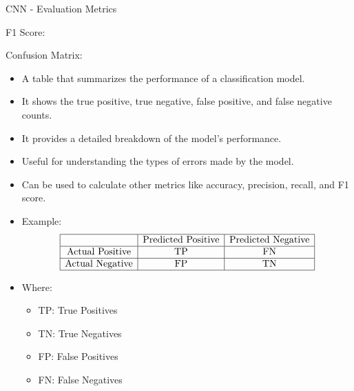 \begin{frame}{CNN - Evaluation Metrics}
\begin{block}{F1 Score:}
\begin{itemize}
    \end{itemize}
\end{block}
\framebreak
\begin{block}{Confusion Matrix:}
    \begin{itemize}
        \item A table that summarizes the performance of a classification model.
        \item It shows the true positive, true negative, false positive, and false negative counts.
        \item It provides a detailed breakdown of the model's performance.
        \item Useful for understanding the types of errors made by the model.
        \item Can be used to calculate other metrics like accuracy, precision, recall, and F1 score.
        \item Example:
            \[
            \begin{array}{|c|c|c|}
            \hline
            & \text{Predicted Positive} & \text{Predicted Negative} \\
            \hline
            \text{Actual Positive} & \text{TP} & \text{FN} \\
            \hline
            \text{Actual Negative} & \text{FP} & \text{TN} \\
            \hline
            \end{array}
            \]
        \item Where:
            \begin{itemize}
                \item TP: True Positives
                \item TN: True Negatives
                \item FP: False Positives
                \item FN: False Negatives
            \end{itemize}
    \end{itemize}
\end{block}
\framebreak


\end{frame}
